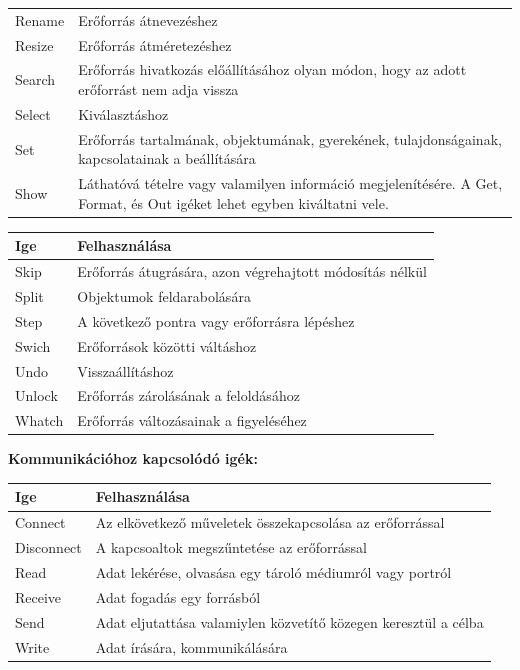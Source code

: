 \documentclass[12pt,oneside,justify,table]{book}
\begin{document}
\begin{appendices}
\begin{tabularx}{\linewidth}{l|X}
Rename & Erőforrás átnevezéshez \\
Resize & Erőforrás átméretezéshez \\
Search & Erőforrás hivatkozás előállításához olyan módon, hogy az adott erőforrást nem adja vissza \\
Select & Kiválasztáshoz \\
Set & Erőforrás tartalmának, objektumának, gyerekének, tulajdonságainak, kapcsolatainak a beállítására \\
Show & Láthatóvá tételre vagy valamilyen információ megjelenítésére. A Get, Format, és Out igéket lehet egyben kiváltatni vele. \\
\end{tabularx}

\noindent
\begin{tabularx}{\linewidth}{l|X}
\rowcolor{blue!50}
\textbf{Ige} & \textbf{Felhasználása} \\
\hline
Skip & Erőforrás átugrására, azon végrehajtott módosítás nélkül \\
Split & Objektumok feldarabolására \\
Step & A következő pontra vagy erőforrásra lépéshez \\
Swich & Erőforrások közötti váltáshoz \\
Undo & Visszaállításhoz \\
Unlock & Erőforrás zárolásának a feloldásához \\
Whatch & Erőforrás változásainak a figyeléséhez \\
\end{tabularx}
\break

\noindent \textbf{Kommunikációhoz kapcsolódó igék:} \cite{VerbsCommunication}\\
\begin{tabularx}{\linewidth}{l|X}
\rowcolor{blue!50}
\textbf{Ige} & \textbf{Felhasználása} \\
\hline
Connect & Az elkövetkező műveletek összekapcsolása az erőforrással \\
Disconnect & A kapcsoaltok megszűntetése az erőforrással \\
Read & Adat lekérése, olvasása egy tároló médiumról vagy portról \\
Receive & Adat fogadás egy forrásból \\
Send & Adat eljutattása valamiylen közvetítő közegen keresztül a célba \\
Write & Adat írására, kommunikálására \\
\end{tabularx}
\break


\end{appendices}
\end{document}
